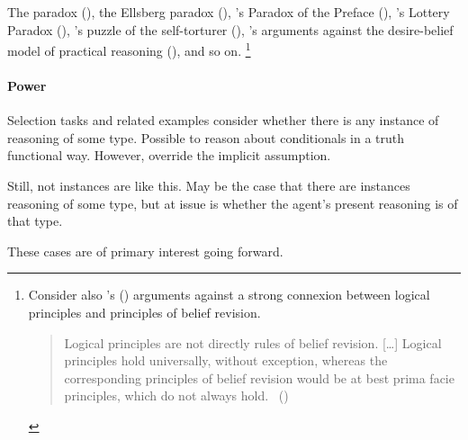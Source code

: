 \begin{note}
  The \citeauthor{Allais:1979aa} paradox (\cite{Allais:1979aa}),
  the Ellsberg paradox (\cite{Ellsberg:1961aa}), \citeauthor{Makinson:1965aa}'s Paradox of the Preface (\citeyear{Makinson:1965aa}), \citeauthor{Kyburg:1997aa}'s Lottery Paradox (\citeyear{Kyburg:1997aa}), \citeauthor{Quinn:1990aa}'s  puzzle of the self-torturer (\citeyear{Quinn:1990aa}), \citeauthor{Bratman:1981aa}'s arguments against the desire-belief model of practical reasoning (\citeyear{Bratman:1981aa,Bratman:1987aa}), and so on.%
  \footnote{
    Consider also \citeauthor{Harman:1984aa}'s (\citeyear{Harman:1984aa,Harman:1986ux}) arguments against a strong connexion between logical principles and principles of belief revision.

  \begin{quote}
    Logical principles are not directly rules of belief revision.
    [\dots]
    Logical principles hold universally, without exception, whereas the corresponding principles of belief revision would be at best prima facie principles, which do not always hold.%
    \mbox{ }\hfill\mbox{(\citeyear[107--108]{Harman:1984aa})}
  \end{quote}
  }
\end{note}

\paragraph*{Power}

\begin{note}
  Selection tasks and related examples consider whether there is any instance of reasoning of some type.
  Possible to reason about conditionals in a truth functional way.
  However, override the implicit assumption.

  Still, not instances are like this.
  May be the case that there are instances reasoning of some type, but at issue is whether the agent's present reasoning is of that type.

  These cases are of primary interest going forward.
\end{note}

